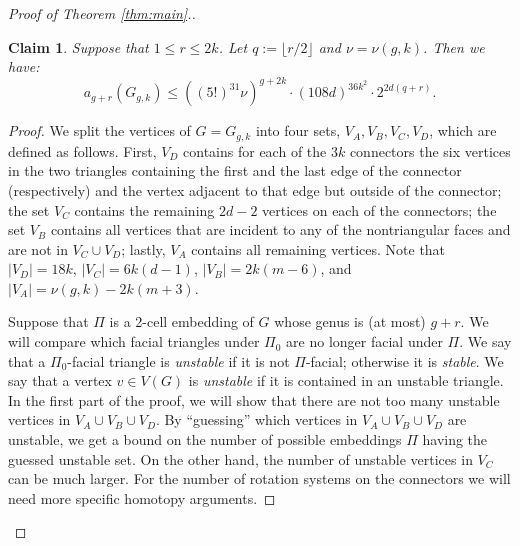 \documentclass[11pt]{article}
\newtheorem{claim}{Claim}
\begin{document}
\begin{proof}[Proof of Theorem \ref{thm:main}.]
  \begin{claim}\label{cl:upper bound}
     Suppose that $1\le r\le 2k$. Let $q:=\lfloor r/2\rfloor$ and $\nu=\nu(g,k)$. Then we have:
     $$
        a_{g+r}(G_{g,k}) \le \left((5!)^{31} \nu\right)^{g+2k} \cdot \left( 108d \right)^{36k^2} \cdot 2^{2d(q+r)} .
     $$
  \end{claim}

  \begin{proof}
  We split the vertices of $G=G_{g,k}$ into four sets, $V_A,V_B,V_C,V_D$, which are defined as follows. First, $V_D$ contains for each of the $3k$ connectors the six vertices in the two triangles containing the first and the last edge of the connector (respectively) and the vertex adjacent to that edge but outside of the connector; the set $V_C$ contains the remaining $2d-2$ vertices on each of the connectors; the set $V_B$ contains all vertices that are incident to any of the nontriangular faces and are not in $V_C\cup V_D$; lastly, $V_A$ contains all remaining vertices.
  Note that $|V_D| = 18k$, $|V_C| = 6k(d-1)$, $|V_B| = 2k(m-6)$, and $|V_A| = \nu(g,k)-2k(m+3)$.

  Suppose that $\Pi$ is a 2-cell embedding of $G$ whose genus is (at most) $g+r$. We will compare which facial triangles under $\Pi_0$ are no longer facial under $\Pi$. We say that a $\Pi_0$-facial triangle is \emph{unstable} if it is not $\Pi$-facial; otherwise it is \emph{stable}. We say that a vertex $v\in V(G)$ is \emph{unstable} if it is contained in an unstable triangle. In the first part of the proof, we will show that there are not too many unstable vertices in $V_A\cup V_B\cup V_D$. By ``guessing'' which vertices in $V_A\cup V_B\cup V_D$ are unstable, we get a bound on the number of possible embeddings $\Pi$ having the guessed unstable set. On the other hand, the number of unstable vertices in $V_C$ can be much larger. For the number of rotation systems on the connectors we will need more specific homotopy arguments.


\end{proof}
\end{proof}
\end{document}

